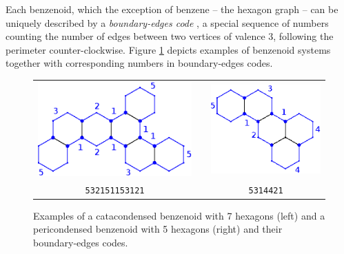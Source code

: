 \documentclass[a4paper,10pt]{article}
\begin{document}
Each benzenoid, which the exception of benzene -- the hexagon graph -- can
be uniquely described by a \emph{boundary-edges code} \cite{hansen1996}, a
special sequence of numbers counting the number of edges between two
vertices of valence 3, following the perimeter counter-clockwise.  Figure
\ref{fig:xample1} depicts examples of benzenoid systems together with
corresponding numbers in boundary-edges codes.

\begin{figure}
\begin{center}
\begin{tabular}{ccc}
  \begin{minipage}{0.45\textwidth}
    \centering
    \includegraphics{figures/fig3}
  \end{minipage}
  &&
  \begin{minipage}{0.45\textwidth}
    \centering
    \includegraphics{figures/fig1}
  \end{minipage}
  \\[3mm]
  \texttt{532151153121} && \texttt{5314421}
\end{tabular}
\end{center}
\caption{Examples of a catacondensed benzenoid with 7 hexagons (left) and a
  pericondensed benzenoid with 5 hexagons (right) and their boundary-edges
  codes.}
\label{fig:xample1}
\end{figure}
\end{document}
